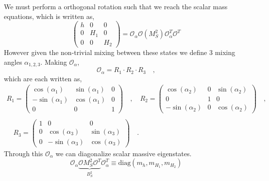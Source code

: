 %
We must perform a orthogonal rotation such that we reach the scalar mass equations, which is written as, 
\begin{equation}
\left( 
\begin{array}{ccc}
h & 0 & 0  \\
0 & H_1 & 0 \\
0 & 0 & H_2 
\end{array} 
\right) = \mathcal{O}_\alpha \mathcal{O} \left(M_S^2\right) \mathcal{O}_\alpha^T \mathcal{O}^T
\end{equation} 
However given the non-trivial mixing between these states we define 3 mixing angles $\alpha_{1,2,3}$. Making $\mathcal{O}_\alpha$, 
\begin{equation}
\mathcal{O}_\alpha = R_1 \cdot R_2 \cdot R_3 \quad , 
\end{equation}
which are each written as,
\begin{gather}
R_1 = \begin{pmatrix}
\cos(\alpha_1) & \sin(\alpha_1) & 0 \\
-\sin(\alpha_1) & \cos(\alpha_1) & 0 \\ 
0 & 0 & 1 
\end{pmatrix} \quad , \quad R_2 = \begin{pmatrix}
\cos(\alpha_2) & 0 & \sin(\alpha_2) \\ 
0 & 1 & 0 \\
-\sin(\alpha_2) & 0 & \cos(\alpha_2) 
\end{pmatrix} \quad ,\\ \\ \quad R_3 = \begin{pmatrix}
1 & 0 & 0 \\
0 & \cos(\alpha_3 ) & \sin(\alpha_3) \\
0 & -\sin(\alpha_3) & \cos(\alpha_3) 
\end{pmatrix} \quad . 
\end{gather}
Through this $\mathcal{O}_\alpha$ we can diagonalize scalar massive eigenstates. 
\begin{equation}
\mathcal{O}_\alpha \underbrace{\mathcal{O} M^2_S \mathcal{O}^T }_{B_S^2} \mathcal{O}_\alpha^T \equiv \text{diag}(m_h,m_{H_1},m_{H_2})
\end{equation}
